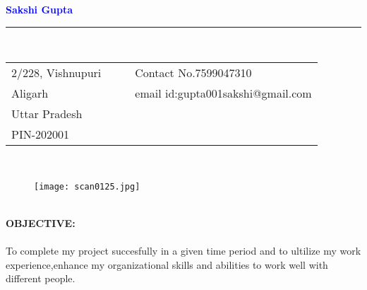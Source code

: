 \documentclass[10pt]{article}
\begin{document}
 
	\begin{center}
		\textbf{\large\textcolor{blue}{Sakshi Gupta}}
		
	\end{center}
	\rule[5pt]{\textwidth}{0.5mm}\\
	\begin{tabular}{l c c l}
		2/228, Vishnupuri & & & \qquad \qquad  \qquad \qquad \qquad \qquad \qquad Contact No.7599047310\\
		Aligarh & &  & \qquad \qquad \qquad \qquad \qquad \qquad \qquad email id:gupta001sakshi@gmail.com\\
		Uttar Pradesh\\
		PIN-202001\\
	\end{tabular}\\
		\begin{figure}[h]
			\begin{flushright}
     	    \texttt{[image: scan0125.jpg]}
			\end{flushright}
		\end{figure}\\
		\textbf{OBJECTIVE:}\\ \\
		To complete my project succesfully in a given time period and to ultilize my work experience,enhance my organizational skills and abilities to work well with different people.
	
\end{document}
